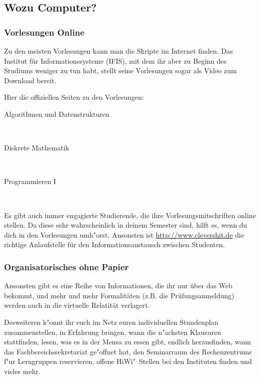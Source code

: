 \subsection{Wozu Computer?}

\subsubsection{Vorlesungen Online}
Zu den meisten Vorlesungen kann man die Skripte im Internet finden. Das Institut 
für Informationssysteme (IFIS), mit dem ihr aber zu Beginn des Studiums 
weniger zu tun habt, stellt seine Vorlesungen sogar als Video zum Download bereit.

Hier die offiziellen Seiten zu den Vorlesungen:

\begin{description}
\item[Algorithmen und Datenstrukturen]~\\
{\footnotesize{}}
\item[Diskrete Mathematik]~\\
{\footnotesize{}}
\item[Programmieren I]~\\
{\footnotesize{}}
\end{description}

Es gibt auch immer engagierte Studierende, die ihre Vorlesungsmitschriften online 
stellen. Da diese sehr wahrscheinlich in deinem Semester sind, hilft es, wenn du dich
in den Vorlesungen umh"orst. Ansonsten ist \url{http://www.clevershit.de} die richtige
Anlaufstelle für den Informationsaustausch zwischen Studenten.

\subsubsection{Organisatorisches ohne Papier}
Ansonsten gibt es eine Reihe von Informationen, die ihr nur über das Web bekommt, 
und mehr und mehr Formalitäten (z.B. die Prüfungsanmeldung) werden auch in
die virtuelle Relatität verlagert.

Desweiteren k"onnt ihr euch im Netz euren individuellen Stundenplan
zusammenstellen, in Erfahrung bringen, wann die n"achsten Klausuren
stattfinden, lesen, was es in der Mensa zu essen gibt, endlich herausfinden,
wann das Fachbereichssekretariat ge"offnet hat, den Seminarraum des
Rechenzentrums f"ur Lerngruppen reservieren, offene HiWi"~Stellen bei den
Instituten finden und vieles mehr.

